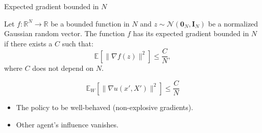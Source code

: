 \documentclass[aspectratio=169,10pt]{beamer}
\newcommand{\expec}[2][]{\ensuremath{\mathbb{E}_{{#1}}\left[ {#2} \right]}}
\begin{document}
\begin{frame}{Expected gradient bounded in $N$}
	\begin{definition} Let $f:\mathbb{R}^N\rightarrow \mathbb{R}$ be a bounded function in $N$ and $z\sim \mathcal{N}(\mathbf{0}_N,\mathbf{I}_N)$ be a normalized Gaussian random vector. The function $f$ has its expected gradient bounded in $N$ if there exists a $C$ such that:
		\begin{equation*}
			\expec{\|\nabla f(z)\|^2} \leq \frac{C}{N},
		\end{equation*}
		where $C$ does not depend on $N$.
	\end{definition}	
$$ \mathbb{E}_W \left[\|\nabla u(x',X')\|^2\right] \leq \frac{C}{N}$$
\begin{itemize}
	\item The policy to be well-behaved (non-explosive gradients).\vspace{0.1in}
	\item Other agent's influence vanishes.
\end{itemize}
\end{frame}
		
\end{document}
